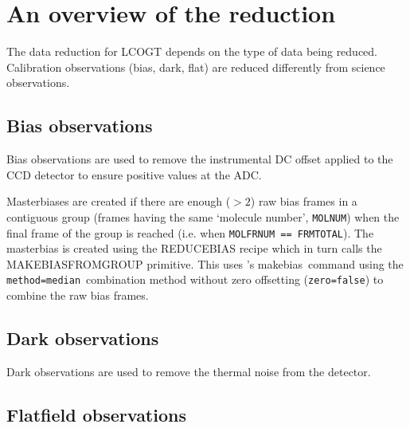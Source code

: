 \documentclass[twoside,11pt]{article}
\newcommand{\xref}[3]{#1}
\renewcommand{\_}{\texttt{\symbol{95}}}
\newcommand{\CCDPACK}{\xref{{\sc{Ccdpack}}}{sun139}{}}
\newcommand{\ORACDR}{{\footnotesize ORAC-DR}}
\newcommand{\task}[1]{\textsf{#1}}
\newcommand{\makebias}{\xref{\task{makebias}}{sun139}{MAKEBIAS}}
\newcommand{\aparam}[1]{\texttt{#1}}     %
\begin{document}



\section{An overview of the reduction}

The data reduction for LCOGT depends on the type of data being
reduced. Calibration observations (bias, dark, flat) are
reduced differently from science observations. 

\subsection{Bias observations}

Bias observations are used to remove the instrumental DC offset applied to the
CCD detector to ensure positive values at the ADC.

Masterbiases are created if there are enough ($>2$) raw bias frames in a
contiguous group (frames having the same `molecule number', {\tt MOLNUM}) when
the final frame of the group is reached (i.e. when  {\tt MOLFRNUM == 
FRMTOTAL}). The masterbias is created using the \task{REDUCE\_BIAS} recipe which
in turn calls the \task{\_MAKE\_BIAS\_FROM\_GROUP\_} primitive. This uses \CCDPACK's \makebias\ command using
the \aparam{method=median}\ combination method without zero offsetting
(\aparam{zero=false}) to combine the raw bias frames.

\subsection{Dark observations}

Dark observations are used to remove the thermal noise from the detector.

\subsection{Flatfield observations}
\end{document}
